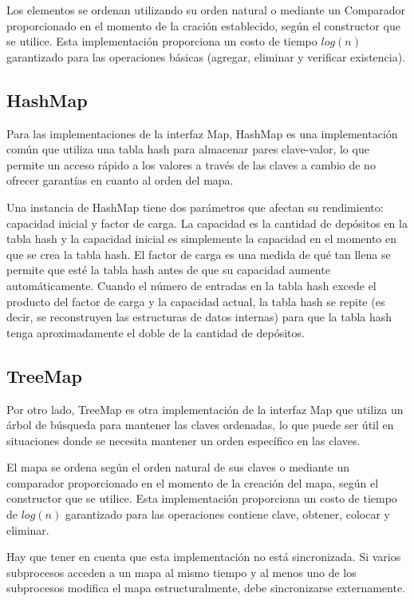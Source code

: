 \documentclass[a4paper,12pt]{article}
\begin{document}
Los elementos se ordenan utilizando su orden natural o mediante un Comparador proporcionado en el momento de la cración establecido, según el constructor que se utilice. Esta implementación proporciona un costo de tiempo $log(n)$ garantizado para las operaciones básicas (agregar, eliminar y verificar existencia). \cite{tree_set}

\subsection{HashMap}

Para las implementaciones de la interfaz Map, HashMap es una implementación común que utiliza una tabla hash para almacenar pares clave-valor, lo que permite un acceso rápido a los valores a través de las claves a cambio de no ofrecer garantías en cuanto al orden del mapa.

Una instancia de HashMap tiene dos parámetros que afectan su rendimiento: capacidad inicial y factor de carga. La capacidad es la cantidad de depósitos en la tabla hash y la capacidad inicial es simplemente la capacidad en el momento en que se crea la tabla hash. El factor de carga es una medida de qué tan llena se permite que esté la tabla hash antes de que su capacidad aumente automáticamente. Cuando el número de entradas en la tabla hash excede el producto del factor de carga y la capacidad actual, la tabla hash se repite (es decir, se reconstruyen las estructuras de datos internas) para que la tabla hash tenga aproximadamente el doble de la cantidad de depósitos. \cite{hash_map}

\subsection{TreeMap}

Por otro lado, TreeMap es otra implementación de la interfaz Map que utiliza un árbol de búsqueda para mantener las claves ordenadas, lo que puede ser útil en situaciones donde se necesita mantener un orden específico en las claves.

El mapa se ordena según el orden natural de sus claves o mediante un comparador proporcionado en el momento de la creación del mapa, según el constructor que se utilice.
Esta implementación proporciona un costo de tiempo de $log(n)$ garantizado para las operaciones contiene clave, obtener, colocar y eliminar. \cite{tree_map}

Hay que tener en cuenta que esta implementación no está sincronizada. Si varios subprocesos acceden a un mapa al mismo tiempo y al menos uno de los subprocesos modifica el mapa estructuralmente, debe sincronizarse externamente. \cite{tree_map}
\end{document}
